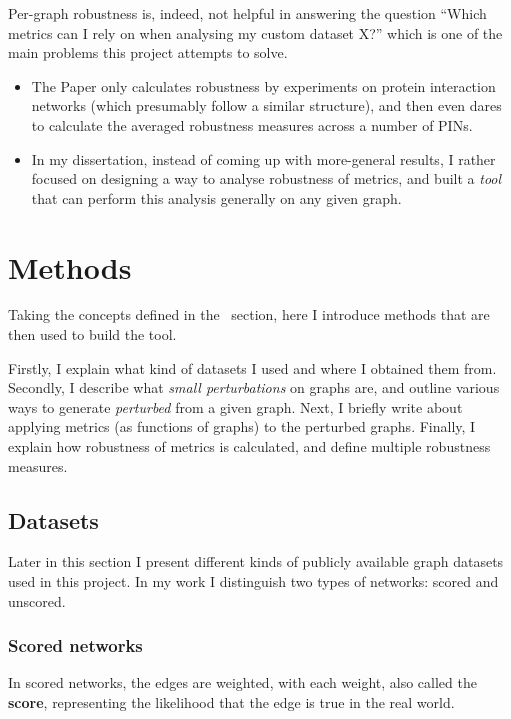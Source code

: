 Per-graph robustness is, indeed, not helpful in answering the question ``Which metrics can I rely on when analysing my custom dataset X?'' which is one of the main problems this project attempts to solve.
\begin{itemize}
    \item The Paper only calculates robustness by experiments on protein interaction networks (which presumably follow a similar structure), and then even dares to calculate the averaged robustness measures across a number of PINs.
    \item In my dissertation, instead of coming up with more-general results, I rather focused on designing a way to analyse robustness of metrics, and built a \textsl{tool} that can perform this analysis generally on any given graph.
\end{itemize}


\section{Methods}\label{sec:methods}

Taking the concepts defined in the~ section, here I introduce methods that are then used to build the \graffs tool.

Firstly, I explain what kind of datasets I used and where I obtained them from.
Secondly, I describe what \textsl{small perturbations} on graphs are, and outline various ways to generate \textsl{perturbed} from a given graph.
Next, I briefly write about applying metrics (as functions of graphs) to the perturbed graphs.
Finally, I explain how robustness of metrics is calculated, and define multiple robustness measures.

\subsection{Datasets}

Later in this section I present different kinds of publicly available graph datasets used in this project.
In my work I distinguish two types of networks: scored and unscored.

\subsubsection{Scored networks}

In scored networks, the edges are weighted, with each weight, also called the \textbf{score}, representing the likelihood that the edge is true in the real world.

